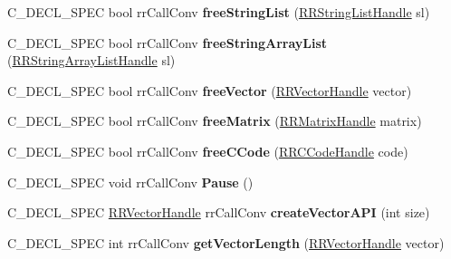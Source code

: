\begin{DoxyCompactItemize}
\item 
\hypertarget{group__loadsave_ga63aea4cfe3b5262e67d50f3227153a16}{
\-C\-\_\-\-D\-E\-C\-L\-\_\-\-S\-P\-E\-C bool rr\-Call\-Conv {\bfseries free\-String\-List} (\hyperlink{struct_r_r_string_list}{\-R\-R\-String\-List\-Handle} sl)}
\label{group__loadsave_ga63aea4cfe3b5262e67d50f3227153a16}

\item 
\hypertarget{group__loadsave_gacca647731a9241ab1f517d569271688b}{
\-C\-\_\-\-D\-E\-C\-L\-\_\-\-S\-P\-E\-C bool rr\-Call\-Conv {\bfseries free\-String\-Array\-List} (\hyperlink{struct_r_r_string_array_list}{\-R\-R\-String\-Array\-List\-Handle} sl)}
\label{group__loadsave_gacca647731a9241ab1f517d569271688b}

\item 
\hypertarget{group__loadsave_ga11dddcdb661f8e82a2f87ecb24ab8968}{
\-C\-\_\-\-D\-E\-C\-L\-\_\-\-S\-P\-E\-C bool rr\-Call\-Conv {\bfseries free\-Vector} (\hyperlink{struct_r_r_vector}{\-R\-R\-Vector\-Handle} vector)}
\label{group__loadsave_ga11dddcdb661f8e82a2f87ecb24ab8968}

\item 
\hypertarget{group__loadsave_gabbbbce24954114b22b13337ccaf63529}{
\-C\-\_\-\-D\-E\-C\-L\-\_\-\-S\-P\-E\-C bool rr\-Call\-Conv {\bfseries free\-Matrix} (\hyperlink{struct_r_r_matrix}{\-R\-R\-Matrix\-Handle} matrix)}
\label{group__loadsave_gabbbbce24954114b22b13337ccaf63529}

\item 
\hypertarget{group__loadsave_ga79f31e58a4a2d24d2f604f4369b6c64f}{
\-C\-\_\-\-D\-E\-C\-L\-\_\-\-S\-P\-E\-C bool rr\-Call\-Conv {\bfseries free\-C\-Code} (\hyperlink{struct_r_r_c_code}{\-R\-R\-C\-Code\-Handle} code)}
\label{group__loadsave_ga79f31e58a4a2d24d2f604f4369b6c64f}

\item 
\hypertarget{group__loadsave_ga5945592b2369af769505a47463be2a43}{
\-C\-\_\-\-D\-E\-C\-L\-\_\-\-S\-P\-E\-C void rr\-Call\-Conv {\bfseries \-Pause} ()}
\label{group__loadsave_ga5945592b2369af769505a47463be2a43}

\item 
\hypertarget{group__loadsave_ga27e208d44bda0c744c9df5906b51cf09}{
\-C\-\_\-\-D\-E\-C\-L\-\_\-\-S\-P\-E\-C \hyperlink{struct_r_r_vector}{\-R\-R\-Vector\-Handle} \*
rr\-Call\-Conv {\bfseries create\-Vector\-A\-P\-I} (int size)}
\label{group__loadsave_ga27e208d44bda0c744c9df5906b51cf09}

\item 
\hypertarget{group__loadsave_ga0c42e94111a64ea70824f92d8c1b564d}{
\-C\-\_\-\-D\-E\-C\-L\-\_\-\-S\-P\-E\-C int rr\-Call\-Conv {\bfseries get\-Vector\-Length} (\hyperlink{struct_r_r_vector}{\-R\-R\-Vector\-Handle} vector)}
\label{group__loadsave_ga0c42e94111a64ea70824f92d8c1b564d}


\end{DoxyCompactItemize}
